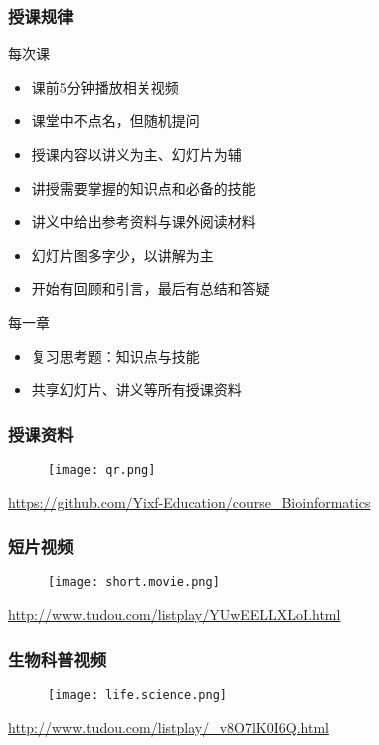 \begin{frame}
  \frametitle{授课规律}
  \begin{block}{每次课}
    \begin{itemize}
      \item 课前5分钟播放相关视频
      \item 课堂中不点名，但随机提问
      \item 授课内容以讲义为主、幻灯片为辅
      \item 讲授需要掌握的知识点和必备的技能
      \item 讲义中给出参考资料与课外阅读材料
      \item 幻灯片图多字少，以讲解为主
      \item 开始有回顾和引言，最后有总结和答疑
    \end{itemize}
  \end{block}
  \pause
  \begin{block}{每一章}
    \begin{itemize}
      \item 复习思考题：知识点与技能
      \item 共享幻灯片、讲义等所有授课资料
    \end{itemize}
  \end{block}
\end{frame}

\begin{frame}
  \frametitle{授课资料}
  \begin{figure}
    \centering
    \texttt{[image: qr.png]}
  \end{figure}
  \begin{center}
    \href{https://github.com/Yixf-Education/course_Statistics_Story}{https://github.com/Yixf-Education/course\_Bioinformatics}
  \end{center}
\end{frame}

\begin{frame}
  \frametitle{短片视频}
  \begin{figure}
    \centering
    \texttt{[image: short.movie.png]}
  \end{figure}
  \begin{center}
    \href{http://www.tudou.com/listplay/YUwEELLXLoI.html}{http://www.tudou.com/listplay/YUwEELLXLoI.html}
  \end{center}
\end{frame}

\begin{frame}
  \frametitle{生物科普视频}
  \begin{figure}
    \centering
    \texttt{[image: life.science.png]}
  \end{figure}
  \begin{center}
    \href{http://www.tudou.com/listplay/_v8O7lK0I6Q.html}{http://www.tudou.com/listplay/\_v8O7lK0I6Q.html}
  \end{center}
\end{frame}

